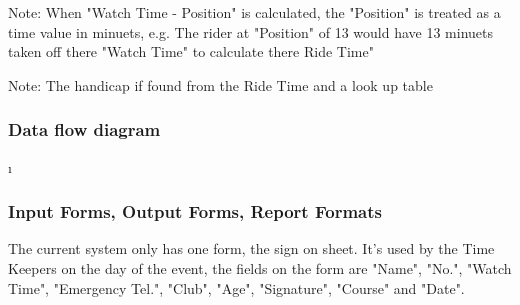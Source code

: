 Note: When "Watch Time - Position" is calculated, the "Position" is treated as a time value in minuets, e.g. The rider at "Position" of 13 would have 13 minuets taken off there "Watch Time" to calculate there Ride Time"

\begin{algorithm}[H]
\label{fig:Time Sort Algorithm}
	\caption{$Time Sort Algorithm$}
\begin{algorithmic}[2]
		\EndIf
	\EndFor
\EndWhile
\end{algorithmic}
\end{algorithm}

\begin{algorithm}[H]
\label{fig:Handicap Time Algorithm}
	\caption{$Handicap Time Algorithm$}
\begin{algorithmic}[3]
\end{algorithmic}
\end{algorithm}

Note: The handicap if found from the Ride Time and a look up table
\subsubsection{Data flow diagram}\i

\subsubsection{Input Forms, Output Forms, Report Formats}
The current system only has one form, the sign on sheet. It's used by the Time Keepers on the day of the event, the fields on the form are "Name", "No.", "Watch Time", "Emergency Tel.", "Club", "Age", "Signature", "Course" and "Date".

